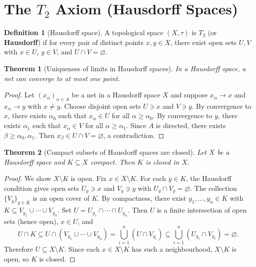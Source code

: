 \documentclass[11pt,a4paper,twoside]{book}
\newtheorem{theorem}{Theorem}[section]
\theoremstyle{remark}
\theoremstyle{definition}
\theoremstyle{definition}
\newtheorem{definition}{Definition}[section]
\begin{document}
\section{The \texorpdfstring{$T_2$}{T2} Axiom (Hausdorff Spaces)}
\label{sec:T2}

\begin{definition}[Hausdorff space]\label{def:T2}
A topological space $(X,\tau)$ is \textbf{$T_2$} (or \textbf{Hausdorff}) if
for every pair of distinct points $x, y \in X$, there exist open sets $U, V$
with $x \in U$, $y \in V$, and $U \cap V = \varnothing$.
\end{definition}

\begin{theorem}[Uniqueness of limits in Hausdorff spaces]
\label{thm:hausdorff-unique-limits}
In a Hausdorff space, a net can converge to at most one point.
\end{theorem}

\begin{proof}
Let $(x_\alpha)_{\alpha \in A}$ be a net in a Hausdorff space $X$ and suppose
$x_\alpha \to x$ and $x_\alpha \to y$ with $x \neq y$.  Choose disjoint open
sets $U \ni x$ and $V \ni y$.  By convergence to $x$, there exists
$\alpha_0$ such that $x_\alpha \in U$ for all $\alpha \ge \alpha_0$.  By
convergence to $y$, there exists $\alpha_1$ such that $x_\alpha \in V$ for all
$\alpha \ge \alpha_1$.  Since $A$ is directed, there exists $\beta \ge
\alpha_0, \alpha_1$.  Then $x_\beta \in U \cap V = \varnothing$, a
contradiction.
\end{proof}

\begin{theorem}[Compact subsets of Hausdorff spaces are closed]
\label{thm:compact-in-hausdorff-closed}
Let $X$ be a Hausdorff space and $K \subseteq X$ compact.  Then $K$ is closed
in $X$.
\end{theorem}

\begin{proof}
We show $X \setminus K$ is open.  Fix $x \in X \setminus K$.  For each
$y \in K$, the Hausdorff condition gives open sets $U_y \ni x$ and
$V_y \ni y$ with $U_y \cap V_y = \varnothing$.  The collection
$\{V_y\}_{y \in K}$ is an open cover of $K$.  By compactness, there exist
$y_1, \ldots, y_n \in K$ with $K \subseteq V_{y_1} \cup \cdots \cup V_{y_n}$.
Set $U = U_{y_1} \cap \cdots \cap U_{y_n}$.  Then $U$ is a finite intersection
of open sets (hence open), $x \in U$, and
\[
  U \cap K \subseteq U \cap (V_{y_1} \cup \cdots \cup V_{y_n})
  = \bigcup_{i=1}^n (U \cap V_{y_i})
  \subseteq \bigcup_{i=1}^n (U_{y_i} \cap V_{y_i})
  = \varnothing.
\]
Therefore $U \subseteq X \setminus K$.  Since each $x \in X \setminus K$ has
such a neighbourhood, $X \setminus K$ is open, so $K$ is closed.
\end{proof}
\end{document}
